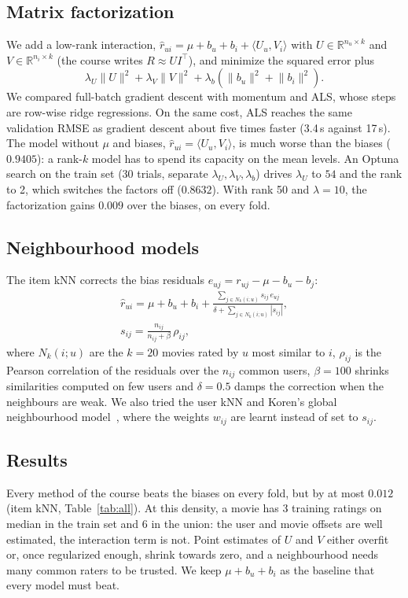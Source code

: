 \documentclass[10pt,a4paper,twocolumn]{article}
\newcommand{\R}{\mathbb{R}}
\newcommand{\rhat}{\hat r}
\begin{document}
\subsection{Matrix factorization}
We add a low-rank interaction, $\rhat_{ui} = \mu + b_u + b_i + \langle U_u, V_i\rangle$ with
$U \in \R^{n_u\times k}$ and $V \in \R^{n_i\times k}$ (the course writes $R \approx U I^\top$), and minimize
the squared error plus
\[
\lambda_U\lVert U\rVert^2 + \lambda_V\lVert V\rVert^2 + \lambda_b(\lVert b_u\rVert^2+\lVert b_i\rVert^2).
\]
We compared full-batch gradient descent with momentum and ALS, whose steps are row-wise ridge regressions.
On the same cost, ALS reaches the same validation RMSE as gradient descent about five times faster (3.4\,s
against 17\,s). The model without $\mu$ and biases, $\rhat_{ui} = \langle U_u, V_i\rangle$, is much worse than
the biases ($0.9405$): a rank-$k$ model has to spend its capacity on the mean levels. An Optuna search on the
train set (30 trials, separate $\lambda_U, \lambda_V, \lambda_b$) drives $\lambda_U$ to $54$ and the rank to 2,
which switches the factors off ($0.8632$). With rank 50 and $\lambda = 10$, the factorization gains $0.009$ over
the biases, on every fold.

\subsection{Neighbourhood models}
The item kNN corrects the bias residuals $e_{uj} = r_{uj} - \mu - b_u - b_j$:
\begin{gather*}
\rhat_{ui} = \mu + b_u + b_i + \frac{\sum_{j \in N_k(i;u)} s_{ij}\, e_{uj}}{\delta + \sum_{j\in N_k(i;u)} |s_{ij}|},\\
s_{ij} = \frac{n_{ij}}{n_{ij}+\beta}\,\rho_{ij},
\end{gather*}
where $N_k(i;u)$ are the $k = 20$ movies rated by $u$ most similar to $i$, $\rho_{ij}$ is the Pearson
correlation of the residuals over the $n_{ij}$ common users, $\beta = 100$ shrinks similarities computed on
few users and $\delta = 0.5$ damps the correction when the neighbours are weak. We also tried the user kNN
and Koren's global neighbourhood model~\cite{koren}, where the weights $w_{ij}$ are learnt instead of set to
$s_{ij}$.

\subsection{Results}
Every method of the course beats the biases on every fold, but by at most $0.012$ (item kNN,
Table~\ref{tab:all}). At this density, a movie has 3 training ratings on median in the train set and 6 in
the union: the user and movie offsets are well estimated, the interaction term is not. Point estimates of
$U$ and $V$ either overfit or, once regularized enough, shrink towards zero, and a neighbourhood needs many
common raters to be trusted. We keep $\mu + b_u + b_i$ as the baseline that every model must beat.
\end{document}
